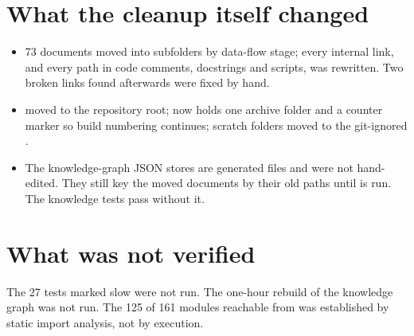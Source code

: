 
\section{What the cleanup itself changed}

\begin{itemize}
  \item 73 documents moved into  subfolders by data-flow stage; every internal link, and every  path in code comments, docstrings and scripts, was rewritten. Two broken links found afterwards were fixed by hand.
  \item {} moved to the repository root;  now holds one archive folder and a counter marker so build numbering continues; scratch folders moved to the git-ignored .
  \item The knowledge-graph JSON stores are generated files and were not hand-edited. They still key the moved documents by their old paths until  is run. The knowledge tests pass without it.
\end{itemize}

\section{What was not verified}

The 27 tests marked slow were not run. The one-hour rebuild of the knowledge graph was not run. The 125 of 161 modules reachable from  was established by static import analysis, not by execution.
